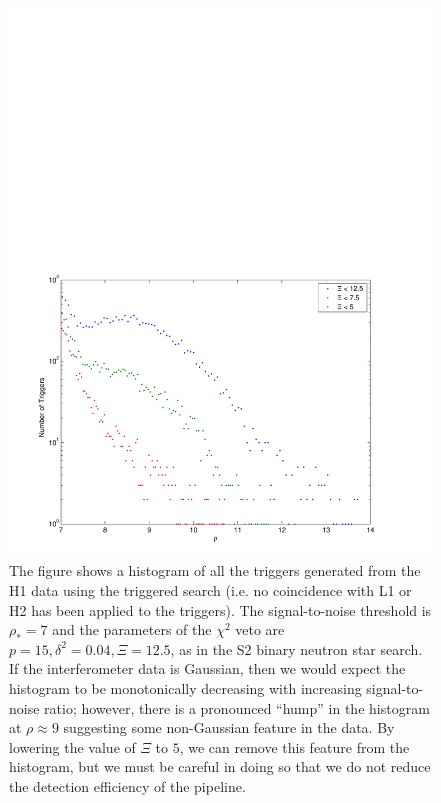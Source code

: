 \begin{figure}[p]
\begin{center}
\includegraphics[width=\textwidth]{figures/result/h1l1_snr_hist_delta_0_04_chisq_12_5}
\end{center}
\caption[Tuning the $\chi^2$ Veto for H1]{%
\label{f:h1_chiqsq_tuning}%
The figure shows a histogram of all the triggers generated from the H1 data
using the triggered search (i.e. no coincidence with L1 or H2 has been applied
to the triggers). The signal-to-noise threshold is $\rho_\ast = 7$ and the
parameters of the $\chi^2$ veto are $p = 15, \delta^2 = 0.04, \Xi = 12.5$, as
in the S2 binary neutron star search. If the interferometer data is Gaussian,
then we would expect the histogram to be monotonically decreasing with
increasing signal-to-noise ratio; however, there is a pronounced ``hump'' in the
histogram at $\rho\approx 9$ suggesting some non-Gaussian feature in the data.
By lowering the value of $\Xi$ to $5$, we can remove this feature from the
histogram, but we must be careful in doing so that we do not reduce the
detection efficiency of the pipeline.
}
\end{figure}

